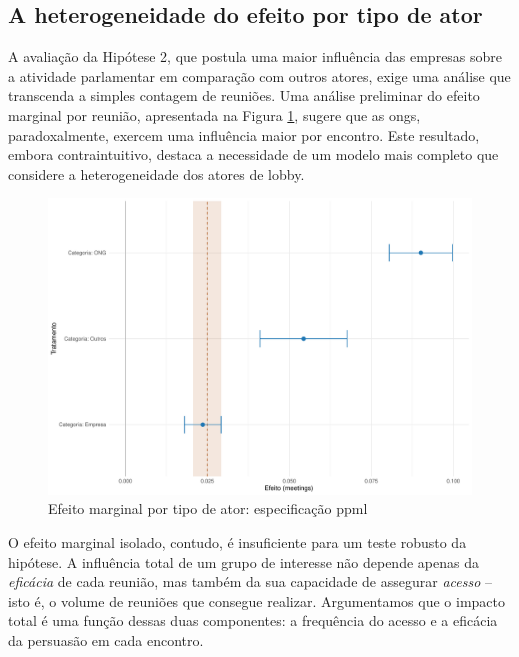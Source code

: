 \subsection{A heterogeneidade do efeito por tipo de ator}

A avaliação da Hipótese 2, que postula uma maior influência das empresas sobre a atividade parlamentar em comparação com outros atores, exige uma análise que transcenda a simples contagem de reuniões. Uma análise preliminar do efeito marginal por reunião, apresentada na Figura \ref{fig:effect_linear_ppml_treatments}, sugere que as \acrshort{ong}s, paradoxalmente, exercem uma influência maior por encontro. Este resultado, embora contraintuitivo, destaca a necessidade de um modelo mais completo que considere a heterogeneidade dos atores de lobby.

\begin{figure}[htbp]
    \centering
    \includegraphics[width=\textwidth]{figures/h2_test/fig_coeff_treatments_overall.pdf}
    \caption{Efeito marginal por tipo de ator: especificação \acrshort{ppml}}
    \label{fig:effect_linear_ppml_treatments}
\end{figure}

O efeito marginal isolado, contudo, é insuficiente para um teste robusto da hipótese. A influência total de um grupo de interesse não depende apenas da \textit{eficácia} de cada reunião, mas também da sua capacidade de assegurar \textit{acesso} -- isto é, o volume de reuniões que consegue realizar. Argumentamos que o impacto total é uma função dessas duas componentes: a frequência do acesso e a eficácia da persuasão em cada encontro.

